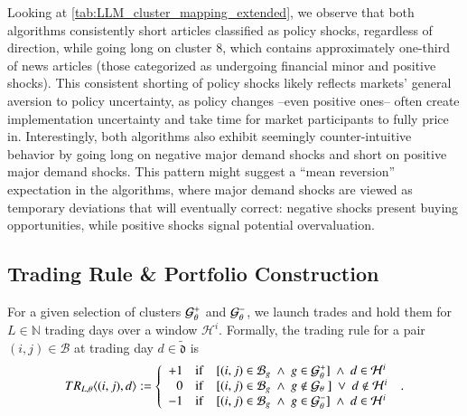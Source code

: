Looking at \cref{tab:LLM_cluster_mapping_extended}, we observe that both algorithms consistently short articles classified as policy shocks, regardless of direction, while going long on cluster 8, which contains approximately one-third of news articles (those categorized as undergoing financial minor and positive shocks). This consistent shorting of policy shocks likely reflects markets' general aversion to policy uncertainty, as policy changes --even positive ones-- often create implementation uncertainty and take time for market participants to fully price in. Interestingly, both algorithms also exhibit seemingly counter-intuitive behavior by going long on negative major demand shocks and short on positive major demand shocks. This pattern might suggest a ``mean reversion'' expectation in the algorithms, where major demand shocks are viewed as temporary deviations that will eventually correct: negative shocks present buying opportunities, while positive shocks signal potential overvaluation.

\subsection{Trading Rule \& Portfolio Construction}
For a given selection of clusters $\G_{\theta}^+$ and $\G_{\theta}^-$, we launch trades and hold them for $L\in\mathbb{N}$ trading days over a window $\mathcal H^i$.
%
Formally, the trading rule
 for a pair $(i,j)\in\mathcal{B}$ at trading day ${d}\in\tilde{\mathfrak d}$ is 
%
\begin{align*}
TR_{{{L}},\theta}\angl{(i,j),{d}} := \mycases{rllllll}{
+1
&\IF 
&
[
(i,j)\in\mathcal{B}_g
~\wedge~
g \in \G_{\theta}^+
]
~\wedge~
{d}\in \mathcal H^i
\\
0
&\IF
&
[
(i,j)\in\mathcal{B}_g
~\wedge~
g \not\in \G_\theta ~
]
~\vee~
{d}
\not\in \mathcal H^i
\\
-1
&\IF 
&
[
(i,j)\in\mathcal{B}_g
~\wedge~
g \in \G_{\theta}^-
]
~\wedge~
{d}
\in \mathcal H^i
}
~.
\end{align*}

